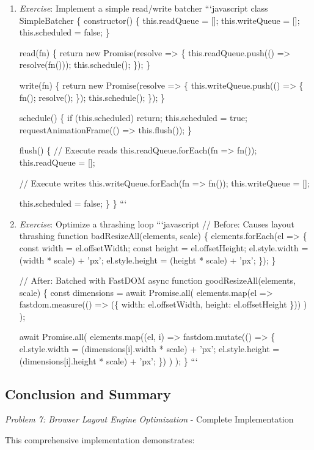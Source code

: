\documentclass[11pt]{article}
\begin{document}
\begin{enumerate}
\item \emph{Exercise}: Implement a simple read/write batcher
```javascript
class SimpleBatcher \{
  constructor() \{
    this.readQueue = [];
    this.writeQueue = [];
    this.scheduled = false;
  \}

read(fn) \{
  return new Promise(resolve => \{
    this.readQueue.push(() => resolve(fn()));
    this.schedule();
  \});
\}

write(fn) \{
  return new Promise(resolve => \{
    this.writeQueue.push(() => \{ fn(); resolve(); \});
    this.schedule();
  \});
\}

schedule() \{
  if (this.scheduled) return;
  this.scheduled = true;
  requestAnimationFrame(() => this.flush());
\}

flush() \{
  // Execute reads
  this.readQueue.forEach(fn => fn());
  this.readQueue = [];

// Execute writes
this.writeQueue.forEach(fn => fn());
this.writeQueue = [];

    this.scheduled = false;
  \}
\}
```

\item \emph{Exercise}: Optimize a thrashing loop
```javascript
// Before: Causes layout thrashing
function badResizeAll(elements, scale) \{
  elements.forEach(el => \{
    const width = el.offsetWidth;
    const height = el.offsetHeight;
    el.style.width = (width * scale) + 'px';
    el.style.height = (height * scale) + 'px';
  \});
\}

// After: Batched with FastDOM
async function goodResizeAll(elements, scale) \{
  const dimensions = await Promise.all(
    elements.map(el =>
      fastdom.measure(() => (\{
        width: el.offsetWidth,
        height: el.offsetHeight
      \}))
    )
  );

  await Promise.all(
    elements.map((el, i) =>
      fastdom.mutate(() => \{
        el.style.width = (dimensions[i].width * scale) + 'px';
        el.style.height = (dimensions[i].height * scale) + 'px';
      \})
    )
  );
\}
```
\end{enumerate}
\subsection{Conclusion and Summary}
\label{sec:org166d834}

\emph{Problem 7: Browser Layout Engine Optimization} - Complete Implementation

This comprehensive implementation demonstrates:
\end{document}
